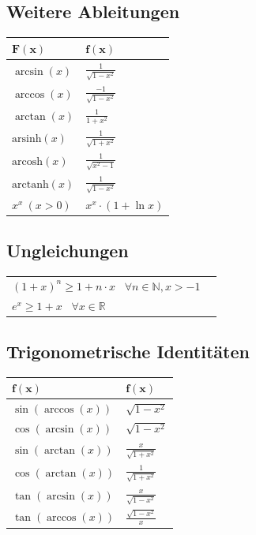 \documentclass[a4paper,10pt]{article}
\begin{document}
\subsection{Weitere Ableitungen}
\begin{center}
  \begin{tabularx}{\linewidth}{>{\centering\arraybackslash}X>{\centering\arraybackslash}X}
  \toprule
  $\mathbf{F(x)}$ & $\mathbf{f(x)}$ \\
  \midrule
  $\arcsin(x)$ & $\frac{1}{\sqrt{1 - x^2}}$ \\
  $\arccos(x)$ & $\frac{-1}{\sqrt{1 - x^2}}$ \\
  $\arctan(x)$ & $\frac{1}{1 + x^2}$ \\ 
  $\text{arsinh}(x)$ & $\frac{1}{\sqrt{1 + x^2}}$ \\
  $\text{arcosh}(x)$ & $\frac{1}{\sqrt{x^2 - 1}}$ \\
  $\text{arctanh}(x)$ & $\frac{1}{\sqrt{1 - x^2}}$ \\
  $x^x \ (x > 0)$ & $x^x \cdot (1 + \ln x)$ \\
  \bottomrule
  \end{tabularx}
\end{center}

\subsection{Ungleichungen}
\begin{center}
  \begin{tabularx}{\linewidth}{>{\centering\arraybackslash}X>{\centering\arraybackslash}X}
    $(1+x)^n \geq 1+ n\cdot x$ \, $\forall n\in \mathbb{N}, x > -1$\\
    $e^x \geq 1 + x$ \, $\forall x\in \mathbb{R}$\\
  \end{tabularx}
\end{center}

\subsection{Trigonometrische Identitäten}
\begin{center}
 \begin{tabularx}{\linewidth}{>{\centering\arraybackslash}X>{\centering\arraybackslash}X}
  \toprule
  $\mathbf{f(x)}$ & $\mathbf{f(x)}$ \\
  \midrule
  $\sin(\arccos (x))$ & $\sqrt{1-x^2}$\\
  $\cos(\arcsin(x))$ & $\sqrt{1-x^2}$\\
  $\sin(\arctan(x))$ & $\frac{x}{\sqrt{1+x^2}}$\\
  $\cos(\arctan(x))$ & $\frac{1}{\sqrt{1+x^2}}$\\
  $\tan(\arcsin(x))$ & $\frac{x}{\sqrt{1-x^2}}$\\
  $\tan(\arccos(x))$ & $\frac{\sqrt{1-x^2}}{x}$\\
  \bottomrule
 \end{tabularx}
\end{center}
\end{document}
